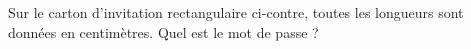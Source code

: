 \begin{enigme}
Sur le carton d'invitation rectangulaire ci-contre, toutes les longueurs sont données en centimètres. Quel est le mot de passe ?
\vspace{1cm}
\begin{center} 

\end{center}
 
 \end{enigme}
 

 

